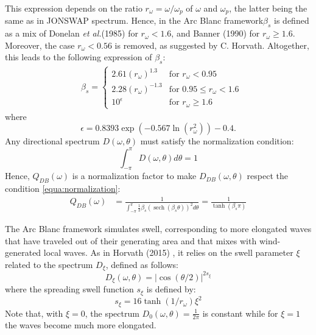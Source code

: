 \documentclass[final]{jcgt}
\def\Framework{The Arc Blanc framework\xspace}
\def\framework{the Arc Blanc framework\xspace}
\def\etal{\emph{et al.}\xspace}
\begin{document}
This expression depends on the ratio $r_{\omega}=\omega/\omega_p$ of $\omega$ and $\omega_p$, the latter being the same as in JONSWAP spectrum.
Hence, in \framework $\beta_s$ is defined as a mix of Donelan \etal (1985) \cite{donelanDirectionalSpectraWindgenerated1985} for $r_{\omega}<1.6$, and Banner (1990) \cite{bannerEquilibriumSpectraWind1990} for $r_{\omega}\geq1.6$.
Moreover, the case $r_{\omega}<0.56$ is removed, as suggested by C. Horvath.
Altogether, this leads to the following expression of $\beta_s$:
\begin{equation}
	\begin{aligned}
		 & \beta_s= \begin{cases}%
			            2.61\left(r_{\omega}\right)^{1.3}  & \text{for } r_{\omega}<0.95          \\
			            2.28\left(r_{\omega}\right)^{-1.3} & \text{for } 0.95 \leq r_{\omega}<1.6 \\
			            10^\epsilon                        & \text{for }  r_{\omega}\geq1.6       %
		            \end{cases}
	\end{aligned}
\end{equation}
where
\begin{equation}
	\epsilon=0.8393 \exp \left(-0.567\ln\left(r_{\omega}^2\right)\right)-0.4.
\end{equation}
Any directional spectrum $D(\omega,\theta)$ must satisfy the normalization condition:
\begin{equation}
	\label{equa:normalization}
	\int_{-\pi}^\pi D(\omega,\theta)d\theta = 1
\end{equation}
Hence, $Q_{DB}(\omega)$ is a normalization factor to make $D_{DB}(\omega, \theta)$ respect the condition \ref{equa:normalization}:
\begin{equation}
	\begin{aligned}
		Q_{DB}(\omega) & = \frac{1}{\displaystyle\int_{-\pi}^\pi \frac{1}{2}\beta_s\left(\operatorname{sech}\left(\beta_s \theta\right)\right)^2 d\theta} = \frac{1}{\tanh\left(\beta_s\pi\right)}
	\end{aligned}
\end{equation}


\Framework simulates swell, corresponding to more elongated waves that have traveled out of their generating area and that mixes with wind-generated local waves.
As in Horvath (2015) \cite{horvathEmpiricalDirectionalWave2015}, it relies on the swell parameter $\xi$ related to the spectrum $D_{\xi}$, defined as follows:
\begin{equation}
	D_{\xi}(\omega, \theta)=|\cos (\theta / 2)|^{2 s_{\xi}}
\end{equation}
where the spreading swell function $s_\xi$ is defined by:
\begin{equation}
	s_\xi = 16 \tanh(1 / r_\omega) \xi^2
\end{equation}
Note that, with $\xi=0$, the spectrum $D_{0}(\omega, \theta)=\frac{1}{2\pi}$ is constant while for $\xi=1$ the waves become much more elongated.
\end{document}
